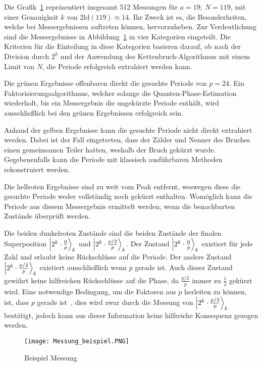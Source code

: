 \vspace{1em}

Die Grafik~\ref{fig:shor_measure} repräsentiert insgesamt 512 Messungen für \(a=19;~N=119\), 
mit einer Genauigkeit \(k\) von \(2\text{ld}(119) \approx 14 \). 
Ihr Zweck ist es, die Besonderheiten, 
welche bei Messergebnissen auftreten können, hervorzuheben.
Zur Verdeutlichung sind die Messergebnisse in Abbildung~\ref{fig:shor_measure} in vier Kategorien eingeteilt.
Die Kriterien für die Einteilung in diese Kategorien basieren darauf, 
ob nach der Division durch \(2^k\) und 
der Anwendung des Kettenbruch-Algorithmus mit einem Limit von \(N\), 
die Periode erfolgreich extrahiert werden kann.

Die grünen Ergebnisse offenbaren direkt die gesuchte Periode von \(p = 24\).
Ein Faktorisierungsalgorithmus, welcher solange die Quanten-Phase-Estimation wiederholt, 
bis ein Messergebnis die ungekürzte Periode enthält, 
wird ausschließlich bei den grünen Ergebnissen erfolgreich sein.

Anhand der gelben Ergebnisse kann die gesuchte Periode nicht direkt extrahiert werden.
Dabei ist der Fall eingetreten, dass der Zähler und Nenner des Bruches einen gemeinsamen Teiler hatten, 
weshalb der Bruch gekürzt wurde.
Gegebenenfalls kann die Periode mit klassisch ausführbaren Methoden rekonstruiert werden.

Die hellroten Ergebnisse sind zu weit vom Peak entfernt,
weswegen diese die gesuchte Periode weder vollständig noch gekürzt enthalten.
Womöglich kann die Periode aus diesem Messergebnis ermittelt werden, 
wenn die benachbarten Zustände überprüft werden.

Die beiden dunkelroten Zustände sind die beiden Zustände der finalen Superposition
\(\ket{2^k \cdot \frac{0}{p}}_k\) und \(\ket{2^k \cdot \frac{p/2}{p}}_k\).
Der Zustand \(\ket{2^k \cdot \frac{0}{p}}_k\) existiert für jede Zahl und erlaubt keine 
Rückschlüsse auf die Periode.
Der andere Zustand \(\ket{2^k \cdot \frac{p/2}{p}}_k\) existiert ausschließlich wenn \(p\) gerade ist.
Auch dieser Zustand gewährt keine hilfreichen Rückschlüsse auf die Phase, 
da \(\frac{p/2}{p}\) immer zu \(\frac{1}{2}\) gekürzt wird.
Eine notwendige Bedingung, um die Faktoren aus \(p\) herleiten zu können, 
ist, dass \(p\) gerade ist~\cite*{Shor_1997}, 
dies wird zwar durch die Messung von \(\ket{2^k \cdot \frac{p/2}{p}}_k\) bestätigt, 
jedoch kann aus dieser Information keine hilfreiche Konsequenz gezogen werden.

\begin{figure} [H]
\caption{Beispiel Messung}
\label{fig:shor_measure}
\texttt{[image: Messung\_beispiel.PNG]}
\centering
\end{figure}

